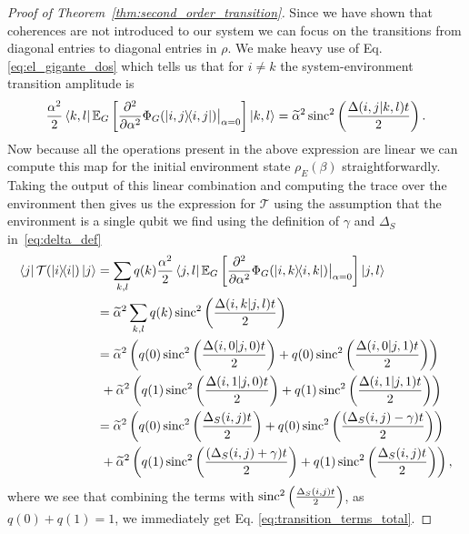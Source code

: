 \begin{proof}[Proof of Theorem~\ref{thm:second_order_transition}]
    Since we have shown that coherences are not introduced to our system we can focus on the transitions from diagonal entries to diagonal entries in $\rho$. We make heavy use of Eq. \eqref{eq:el_gigante_dos} which tells us that for $i \neq k$ the system-environment transition amplitude is
    \begin{equation}
        \frac{\alpha^2}{2}\bra{k, l} \mathbb{E}_G \left[ \frac{\partial^2}{\partial \alpha^2} \Phi_G(\ketbra{i, j}{i,j}) \big|_{\alpha = 0} \right] \ket{k, l} = \widetilde{\alpha}^2 \operatorname{sinc}^2 \left( \frac{\Delta(i,j | k, l) t}{2} \right). 
    \end{equation}
    Now because all the operations present in the above expression are linear we can compute this map for the initial environment state $\rho_E(\beta)$ straightforwardly. Taking the output of this linear combination and computing the trace over the environment then gives us the expression for $\mathcal{T}$ using the assumption that the environment is a single qubit we find using the definition of $\gamma$ and $\Delta_S$ in~\eqref{eq:delta_def}
    \begin{align}
        \bra{j} \mathcal{T}(\ketbra{i}{i}) \ket{j} &= \sum_{k, l} q(k) \frac{\alpha^2}{2}\bra{j, l} \mathbb{E}_G \left[ \frac{\partial^2}{\partial \alpha^2} \Phi_G(\ketbra{i, k}{i,k}) \big|_{\alpha = 0} \right] \ket{j, l} \\
        &= \widetilde{\alpha}^2 \sum_{k, l} q(k) \operatorname{sinc}^2 \left(\frac{\Delta(i, k | j , l) t}{2} \right) \\
        &= \widetilde{\alpha}^2 \left(q(0) \operatorname{sinc}^2 \left(\frac{\Delta(i, 0 | j , 0) t}{2} \right) + q(0) \operatorname{sinc}^2 \left(\frac{\Delta(i, 0 | j , 1) t}{2} \right) \right) \nonumber \\
        & ~+ \widetilde{\alpha}^2 \left(q(1) \operatorname{sinc}^2 \left(\frac{\Delta(i, 1 | j , 0) t}{2} \right) + q(1) \operatorname{sinc}^2 \left(\frac{\Delta(i, 1 | j , 1) t}{2} \right) \right) \\
        &= \widetilde{\alpha}^2 \left(q(0) \operatorname{sinc}^2 \left(\frac{\Delta_S(i,j) t}{2} \right) + q(0) \operatorname{sinc}^2 \left(\frac{(\Delta_S(i,j) - \gamma) t}{2} \right) \right) \nonumber \\
        & ~+ \widetilde{\alpha}^2 \left(q(1) \operatorname{sinc}^2 \left(\frac{(\Delta_S(i, j) + \gamma) t}{2} \right) + q(1) \operatorname{sinc}^2 \left(\frac{\Delta_S(i,j) t}{2} \right) \right),
    \end{align}
    where we see that combining the terms with $\operatorname{sinc}^2 \left(\frac{\Delta_S(i,j) t}{2} \right)$, as $q(0) + q(1) = 1$, we immediately get Eq. \eqref{eq:transition_terms_total}. 


\end{proof}
